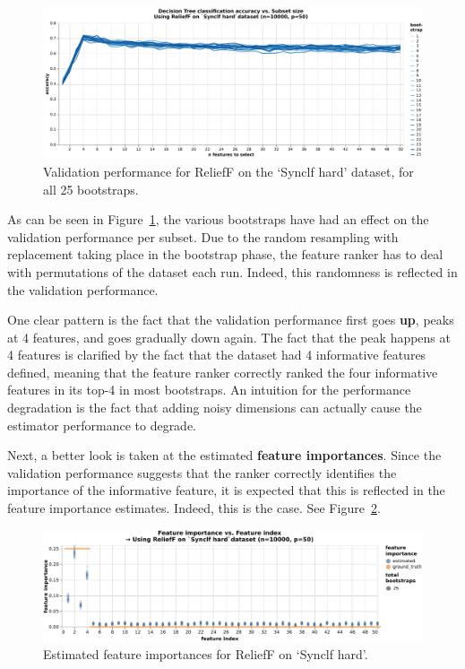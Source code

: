 \documentclass[../main.tex]{subfiles}
\begin{document}
\begin{figure}[ht]
    \centering
    \includegraphics[width=\linewidth]{report/images/results-validation-dt-relieff.pdf}
    \caption{Validation performance for ReliefF on the `Synclf hard' dataset, for all 25 bootstraps.}
    \label{fig:results-validation-dt-relieff}
\end{figure}

As can be seen in Figure~\ref{fig:results-validation-dt-relieff}, the various bootstraps have had an effect on the validation performance per subset. Due to the random resampling with replacement taking place in the bootstrap phase, the feature ranker has to deal with permutations of the dataset each run. Indeed, this randomness is reflected in the validation performance.

One clear pattern is the fact that the validation performance first goes \textbf{up}, peaks at 4 features, and goes gradually down again. The fact that the peak happens at 4 features is clarified by the fact that the dataset had 4 informative features defined, meaning that the feature ranker correctly ranked the four informative features in its top-4 in most bootstraps. An intuition for the performance degradation is the fact that adding noisy dimensions can actually cause the estimator performance to degrade.



Next, a better look is taken at the estimated \textbf{feature importances}. Since the validation performance suggests that the ranker correctly identifies the importance of the informative feature, it is expected that this is reflected in the feature importance estimates. Indeed, this is the case. See Figure~\ref{fig:results-importances-relieff}.

\begin{figure}[ht]
    \centering
    \includegraphics[width=\linewidth]{report/images/results-importances-relieff.pdf}
    \caption{Estimated feature importances for ReliefF on `Synclf hard'.}
    \label{fig:results-importances-relieff}
\end{figure}
\end{document}
